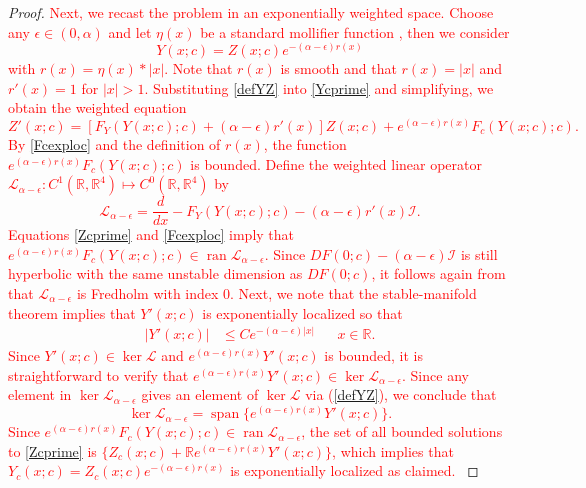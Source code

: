 \documentclass[review,onefignum,onetabnum]{siamart171218}
\newcommand{\R}{\mathbb{R}}
\def\ker{\mathop\mathrm{ker}\nolimits}
\def\Ran{\mathop\mathrm{ran}\nolimits}
\def\Span{\mathop\mathrm{span}\nolimits}
\newcommand{\calI}{\mathcal{I}}
\newcommand{\calL}{\mathcal{L}}
\newcommand{\revised}[1]{ \textcolor{red}{#1} }
\begin{document}
\begin{lemma}
\begin{proof}
\revised{
Next, we recast the problem in an exponentially weighted space. Choose any $\epsilon \in (0,\alpha)$ and let $\eta(x)$ be a standard mollifier function \cite[Section~C.5]{Evans2010}, then we consider
\begin{equation}\label{defYZ}
Y(x; c) = Z(x; c) e^{-(\alpha - \epsilon)r(x)}
\end{equation}
with $r(x) = \eta(x) * |x|$. Note that $r(x)$ is smooth and that $r(x) = |x|$ and $r'(x) = 1$ for $|x| > 1$. Substituting \cref{defYZ} into \cref{Ycprime} and simplifying, we obtain the weighted equation
\begin{equation}\label{Zcprime}
Z'(x; c) = [F_Y(Y(x;c); c) + (\alpha - \epsilon) r'(x) ] Z(x; c) + e^{(\alpha - \epsilon)r(x)} F_c(Y(x;c); c).
\end{equation}
By \cref{Fcexploc} and the definition of $r(x)$, the function $e^{(\alpha - \epsilon)r(x)} F_c(Y(x;c); c)$ is bounded. Define the weighted linear operator $\calL_{\alpha - \epsilon}: C^1(\R, \R^4) \mapsto C^0(\R, \R^4)$ by
\begin{equation}\label{suspdefLalpha}
\calL_{\alpha - \epsilon} = \frac{d}{dx} - F_Y(Y(x;c); c) - (\alpha - \epsilon) r'(x) \calI.
\end{equation}
Equations \cref{Zcprime} and \cref{Fcexploc} imply that $e^{(\alpha - \epsilon)r(x)} F_c(Y(x;c); c) \in \Ran \calL_{\alpha - \epsilon}$. Since $DF(0; c)-(\alpha-\epsilon)\calI$ is still hyperbolic with the same unstable dimension as $DF(0; c)$, it follows again from \cite[Lemma 4.2]{Palmer1984} that $\calL_{\alpha - \epsilon}$ is Fredholm with index 0. Next, we note that the stable-manifold theorem implies that $Y'(x; c)$ is exponentially localized so that
\begin{align}\label{Yprimeloc}
|Y'(x; c)| &\leq C e^{-(\alpha - \epsilon)|x|} && x \in \R.
\end{align}
Since $Y'(x; c) \in \ker \calL$ and $e^{(\alpha - \epsilon)r(x)} Y'(x; c)$ is bounded, it is straightforward to verify that $e^{(\alpha - \epsilon)r(x)} Y'(x; c) \in \ker \calL_{\alpha - \epsilon}$. Since any element in $\ker \calL_{\alpha - \epsilon}$ gives an element of $\ker \calL$ via (\ref{defYZ}), we conclude that
\[
\ker \calL_{\alpha - \epsilon} = \Span\{ e^{(\alpha - \epsilon)r(x)} Y'(x; c)\}.
\]
Since $e^{(\alpha - \epsilon)r(x)} F_c(Y(x;c); c) \in \Ran \calL_{\alpha - \epsilon}$, the set of all bounded solutions to \cref{Zcprime} is $\{Z_c(x; c) + \R e^{(\alpha - \epsilon)r(x)} Y'(x;c)\}$, which implies that $Y_c(x; c) = Z_c(x; c) e^{-(\alpha - \epsilon)r(x)}$ is exponentially localized as claimed.
}
\end{proof}
\end{lemma}
\end{document}

